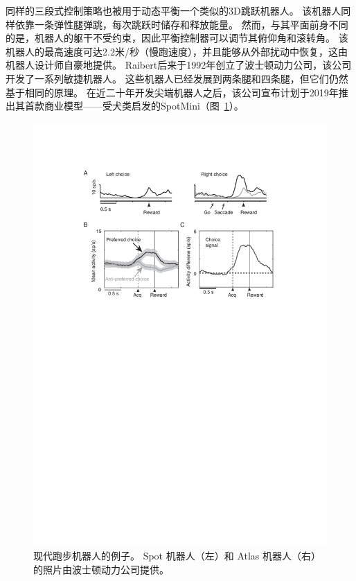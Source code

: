 同样的三段式控制策略也被用于动态平衡一个类似的3D跳跃机器人\cite{raibert1984machines}。
该机器人同样依靠一条弹性腿弹跳，每次跳跃时储存和释放能量。
然而，与其平面前身不同的是，机器人的躯干不受约束，因此平衡控制器可以调节其俯仰角和滚转角。
该机器人的最高速度可达2.2米/秒（慢跑速度），并且能够从外部扰动中恢复，这由机器人设计师自豪地提供。
Raibert后来于1992年创立了波士顿动力公司，该公司开发了一系列敏捷机器人。
这些机器人已经发展到两条腿和四条腿，但它们仍然基于相同的原理。
在近二十年开发尖端机器人之后，该公司宣布计划于2019年推出其首款商业模型——受犬类启发的SpotMini（图~\ref{fig:3_9}）。


\begin{figure}[!htb]
	\centering
	\includegraphics[width=1.0\linewidth]{chap3/3_9}
	\caption{现代跑步机器人的例子。
		Spot 机器人（左）和 Atlas 机器人（右）的照片由波士顿动力公司提供。 \label{fig:3_9}}
\end{figure}


